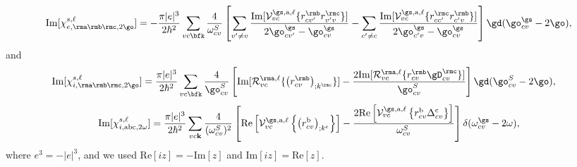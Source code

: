 \begin{equation}\label{c-calvimchie2wn}
\mathrm{Im}[\chi_{e,\rma\rmb\rmc,2\go}^{s,\ell}] =
-\frac{\pi |e|^3}{2\hbar^2}\sum_{vc\bfk}\frac{4}{\omega^{S}_{cv}}
\left[
\sum_{v'\ne
  v}\frac{\mathrm{Im}[\mathcal{V}^{\gs,\text{a},\ell}_{vc}\{r^{\rmb}_{cv'}r^{\rmc}_{v'v}\}]}
{2\go^\gs_{cv'}-\go^\gs_{cv}}
- \sum_{c'\ne
  c}\frac{\mathrm{Im}[\mathcal{V}^{\gs,\text{a},\ell}_{vc}\{r^{\rmc}_{cc'}r^{\rmb}_{c'v}\}]}
{2\go^\gs_{c'v}-\go^\gs_{cv}}
\right]\gd(\go^\gs_{cv}-2\go),
\end{equation}
 and
\begin{align}\label{imchi2wf}
\mathrm{Im}[\chi_{i,\rma\rmb\rmc,2\go}^{s,\ell}]
&=
\frac{\pi|e|^3}{2\hbar^2}\sum_{vc\bfk}
\frac{4}{\go^S_{cv}}
\left[
\mathrm{Im}[{\cal R}^{\rma,\ell}_{vc}\{\left(r^{\rmb}_{cv}\right)_{;k^{\rmc}}\}]
-
\frac{2\mathrm{Im}[{\cal R}^{\rma,\ell}_{vc}\{r^{\rmb}_{cv}\gD^{\rmc}_{cv}\}]}{\go^S_{cv}}
\right]\gd(\go^S_{cv}-2\go)
,
\end{align}
\begin{equation}\label{c-calvimchi2wn}
\mathrm{Im}[\chi_{i,\text{a}\text{b}\text{c},2\omega}^{s,\ell}] 
=
 \frac{\pi \vert
   e\vert^{3}}{2\hbar^2}\sum_{vc\mathbf{k}}\frac{4}{(\omega^{S}_{cv})^{2}}
\left[\mathrm{Re}\left[\mathcal{V}^{\gs,\text{a},\ell}_{vc}\left\{\left(r^{\text{b}}_{cv}\right)_{;k^{\text{c}}}
\right\}\right] -
\frac{2\mathrm{Re}\left[\mathcal{V}^{\gs,\text{a},\ell}_{vc}\left\{r^{\text{b}}_{cv}
\Delta^{\text{c}}_{cv}\right\}\right]}{\omega^{S}_{cv}}\right]\delta(\omega^\gs_{cv}-2\omega)
,
\end{equation}
where $e^3=-|e|^3$, and we used 
$\mathrm{Re}[iz]=-\mathrm{Im}[z]$
and
$\mathrm{Im}[iz]=\mathrm{Re}[z]$.
